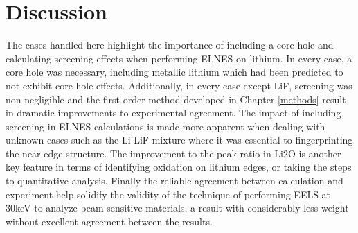 \section{Discussion}
The cases handled here highlight the importance of including a core hole and calculating screening effects when performing ELNES on lithium.  In every case, a core hole was necessary, including metallic lithium which had been predicted to not exhibit core hole effects.  Additionally, in every case except LiF, screening was non negligible and the first order method developed in Chapter \ref{methods} result in dramatic improvements to experimental agreement.  The impact of including screening in ELNES calculations is made more apparent when dealing with unknown cases such as the Li-LiF mixture where it was essential to fingerprinting the near edge structure.  The improvement to the peak ratio in $ \mathrm{Li2O} $ is another key feature in terms of identifying oxidation on lithium edges, or taking the steps to quantitative analysis.  Finally the reliable agreement between calculation and experiment help solidify the validity of the technique of performing EELS at 30keV to analyze beam sensitive materials, a result with considerably less weight without excellent agreement between the results.  





